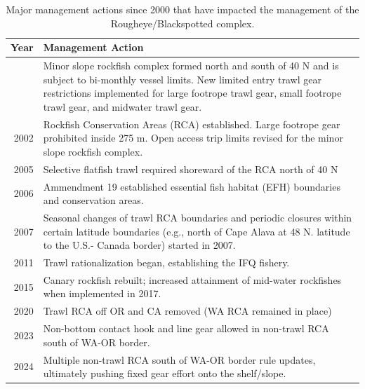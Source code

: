 \documentclass[
]{article}
\begin{document}
\begin{longtable}{r>{\raggedright\arraybackslash}p{\dimexpr 300.00pt -2\tabcolsep-1.5\arrayrulewidth}}

\caption{\label{tbl-management_summary}Major management actions since
2000 that have impacted the management of the Rougheye/Blackspotted
complex.}

\tabularnewline

\toprule
Year & Management Action \\ 
\midrule\addlinespace[2.5pt]
2000 & Minor slope rockfish complex formed north and south of 40\textdegree 10 N and is subject to bi-monthly vessel limits. New limited entry trawl gear restrictions implemented for large footrope trawl gear, small footrope trawl gear, and midwater trawl gear. \\ 
2002 & Rockfish Conservation Areas (RCA) established. Large footrope gear prohibited inside 275 m. Open access trip limits revised for the minor slope rockfish complex. \\ 
2005 & Selective flatfish trawl required shoreward of the RCA north of 40\textdegree 10 N \\ 
2006 & Ammendment 19 established essential fish habitat (EFH) boundaries and conservation areas. \\ 
2007 & Seasonal changes of trawl RCA boundaries and periodic closures within certain latitude boundaries (e.g., north of Cape Alava at 48\textdegree10 N. latitude to the U.S.- Canada border) started in 2007. \\ 
2011 & Trawl rationalization began, establishing the IFQ fishery. \\ 
2015 & Canary rockfish rebuilt; increased attainment of mid-water rockfishes when implemented in 2017.  \\ 
2020 & Trawl RCA off OR and CA removed (WA RCA remained in place) \\ 
2023 & Non-bottom contact hook and line gear allowed in non-trawl RCA south of WA-OR border. \\ 
2024 & Multiple non-trawl RCA south of WA-OR border rule updates, ultimately pushing fixed gear effort onto the shelf/slope.  \\ 
\bottomrule

\end{longtable}

\endgroup

\pagebreak
\end{document}
